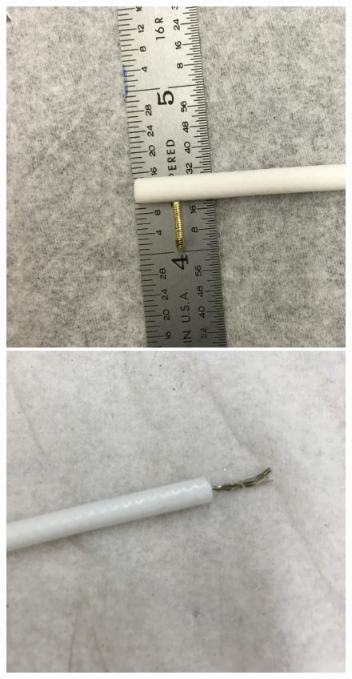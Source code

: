 \begin{figure}[htbp]
\begin{minipage}{0.43\textwidth}
    \includegraphics[width=\linewidth]{figures/testbed/ft3_1.jpg}
    \end{minipage}
    \hspace{\fill} %
    \begin{minipage}{0.47\textwidth}
    \includegraphics[width=\linewidth]{figures/testbed/ft3_2.jpg}
    \end{minipage}


\end{figure}
